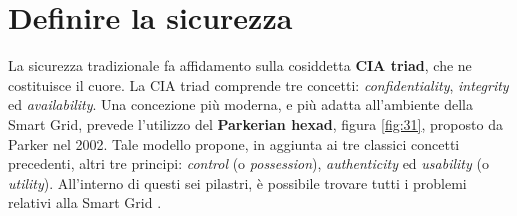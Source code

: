 \section{Definire la sicurezza}
La sicurezza tradizionale fa affidamento sulla cosiddetta \textbf{CIA triad}, che ne costituisce il cuore. La CIA triad comprende tre concetti: \emph{confidentiality}, \emph{integrity} ed \emph{availability}. \newline Una concezione più moderna, e più adatta all'ambiente della Smart Grid, prevede l'utilizzo del \textbf{Parkerian hexad}, figura \ref{fig:31}, proposto da Parker nel 2002. Tale modello propone, in aggiunta ai tre classici concetti precedenti, altri tre principi: \emph{control} (o \emph{possession}), \emph{authenticity} ed \emph{usability} (o \emph{utility}). \newline All'interno di questi sei pilastri, è possibile trovare tutti i problemi relativi alla Smart Grid \cite{smartgrids}.
\begin{figure}[h]
\end{figure}
